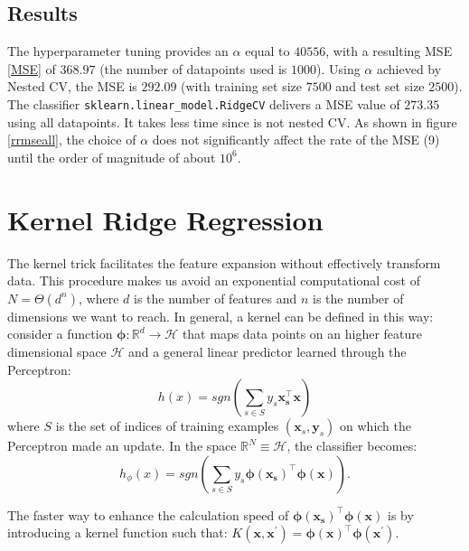 \documentclass{article}
\begin{document}
\subsection{Results}
The hyperparameter tuning provides an $\alpha$ equal to $40556$, with a resulting MSE \eqref{MSE} of $368.97$ (the number of datapoints used is $1000$). Using $\alpha$ achieved by Nested CV, the MSE is $292.09$ (with training set size $7500$ and test set size $2500$). The classifier \texttt{sklearn.linear\_model.RidgeCV} delivers a MSE value of $273.35$ using all datapoints. It takes less time since is not nested CV. As shown in figure \ref{rrmseall}, the choice of $\alpha$ does not significantly affect the rate of the MSE (9) until the order of magnitude of about $10^6$.

\section{Kernel Ridge Regression}
The kernel trick facilitates the feature expansion without effectively transform data. This procedure makes us avoid an exponential computational cost of $N = \Theta(d^n)$, where $d$ is the number of features and $n$ is the number of dimensions we want to reach. In general, a kernel can be defined in this way: consider a function $\boldsymbol{\phi}: \mathbb{R}^d \rightarrow \mathcal{H}$ that maps data points on an higher feature dimensional space $\mathcal{H}$ and a general linear predictor learned through the Perceptron: \begin{equation}
h(x) = sgn\left(\sum_{s \in S}y_s\boldsymbol{x_s^\top}\boldsymbol{x}\right)
\end{equation} where $S$ is the set of indices of training examples $(\boldsymbol{x}_s,\boldsymbol{y}_s)$ on which the Perceptron made an update. In the space $\mathbb{R}^N \equiv \mathcal{H}$, the classifier becomes: \begin{equation}
h{_\phi}(x) = sgn\left(\sum_{s \in S}y_s\boldsymbol{\phi(x_s)^\top}\boldsymbol{\phi(x)}\right).
\end{equation}
    
    
The faster way to enhance the calculation speed of $\boldsymbol{\phi(x_s)^\top}\boldsymbol{\phi(x)}$ is by introducing a kernel function such that: $K(\boldsymbol{x},\boldsymbol{x^\prime}) = \boldsymbol{\phi(x)^\top}\boldsymbol{\phi(x^\prime)}.$
\end{document}

